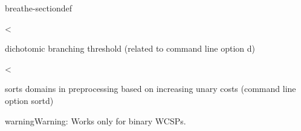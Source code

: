 \documentclass[letterpaper,10pt,openany,oneside,english]{sphinxmanual}
\begin{document}
\begin{fulllineitems}
\begin{sphinxuseclass}{breathe-sectiondef}
\begin{fulllineitems}
\end{fulllineitems}


\begin{fulllineitems}
\label{\detokenize{ref/ref_cpp:_CPPv4N8ToulBar211sortDomainsE}}\label{\detokenize{ref/ref_cpp:_CPPv3N8ToulBar211sortDomainsE}}\label{\detokenize{ref/ref_cpp:_CPPv2N8ToulBar211sortDomainsE}}\label{\detokenize{ref/ref_cpp:ToulBar2::sortDomains__b}}
\pysigstartsignatures
\pysigstartmultiline
{}
\pysigstopmultiline
\pysigstopsignatures
\sphinxAtStartPar
\textless{} 

\sphinxAtStartPar
dichotomic branching threshold (related to command line option \sphinxhyphen{}d) 

\end{fulllineitems}


\begin{fulllineitems}
\label{\detokenize{ref/ref_cpp:_CPPv4N8ToulBar213sortedDomainsE}}\label{\detokenize{ref/ref_cpp:_CPPv3N8ToulBar213sortedDomainsE}}\label{\detokenize{ref/ref_cpp:_CPPv2N8ToulBar213sortedDomainsE}}\label{\detokenize{ref/ref_cpp:ToulBar2::sortedDomains__map:i.ValueCostP:}}
\pysigstartsignatures
\pysigstartmultiline
{}
\pysigstopmultiline
\pysigstopsignatures
\sphinxAtStartPar
\textless{} 

\sphinxAtStartPar
sorts domains in preprocessing based on increasing unary costs (command line option \sphinxhyphen{}sortd) 

\begin{sphinxadmonition}{warning}{Warning:}
\sphinxAtStartPar
Works only for binary WCSPs. 
\end{sphinxadmonition}


\end{fulllineitems}
\end{sphinxuseclass}
\end{fulllineitems}
\end{document}
